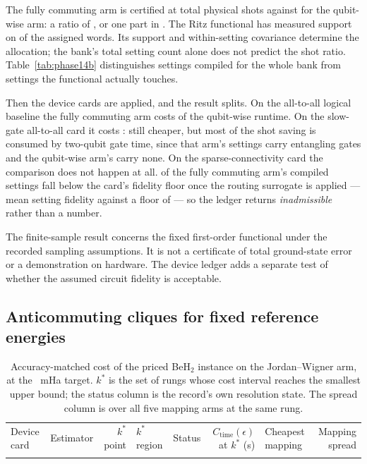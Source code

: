 \documentclass[aps,pra,reprint,superscriptaddress,nofootinbib,floatfix,
  showkeys]{revtex4-2}
\newcommand{\Ctime}{C_{\mathrm{time}}(\epsilon)}
\begin{document}
The fully commuting arm is certified at \cqcFullCertifiedShots{} total physical
shots against \cqcQWCCertifiedShots{} for the qubit-wise arm: a ratio of
\cqcShotRatio{}, or one part in \cqcShotRatioInverse{}. The Ritz functional has measured support on
\cqcRitzSupport{} of the \cqcBankWords{} assigned words. Its support and
within-setting covariance determine the allocation; the bank's total setting
count alone does not predict the shot ratio. Table~\ref{tab:phase14b}
distinguishes settings compiled for the whole bank from settings the functional
actually touches.

Then the device cards are applied, and the result splits.  On the all-to-all
logical baseline the fully commuting arm costs \cqcLogicalRuntimeRatio{} of the
qubit-wise runtime.  On the slow-gate all-to-all card it costs
\cqcIonRuntimeRatio{}: still cheaper, but most of the shot saving is consumed by
two-qubit gate time, since that arm's settings carry entangling gates and the
qubit-wise arm's carry none.  On the sparse-connectivity card the comparison
does not happen at all.  \cqcSCInadmissibleSettings{} of the fully commuting
arm's \cqcSCSettings{} compiled settings fall below the card's fidelity floor
once the routing surrogate is applied --- mean setting fidelity
\cqcSCMeanFidelity{} against a floor of \cqcSCFidelityFloor{} --- so the ledger
returns \emph{inadmissible} rather than a number.

The finite-sample result concerns the fixed first-order functional under the
recorded sampling assumptions. It is not a certificate of total ground-state
error or a demonstration on hardware. The device ledger adds a separate test of
whether the assumed circuit fidelity is acceptable.

\subsection{Anticommuting cliques for fixed reference energies}
\label{sec:cliques}

\begin{table}
  \caption{Accuracy-matched cost of the priced BeH$_2$ instance on the
  Jordan--Wigner arm, at the \cqcTargetMilliHartree{}~mHa target.  $k^*$ is the
  set of rungs whose cost interval reaches the smallest upper bound; the status
  column is the record's own resolution state.  The spread column is over all
  five mapping arms at the same rung.}
  \label{tab:cost}
  \footnotesize
  \begin{ruledtabular}
  \begin{tabular}{llrllrlr}
  Device card & Estimator & $k^*$ point & $k^*$ region & Status & $\Ctime$ at $k^*$ (s) & Cheapest mapping & Mapping spread \\
  \colrule
  
  \end{tabular}
  \end{ruledtabular}
\end{table}
\end{document}
